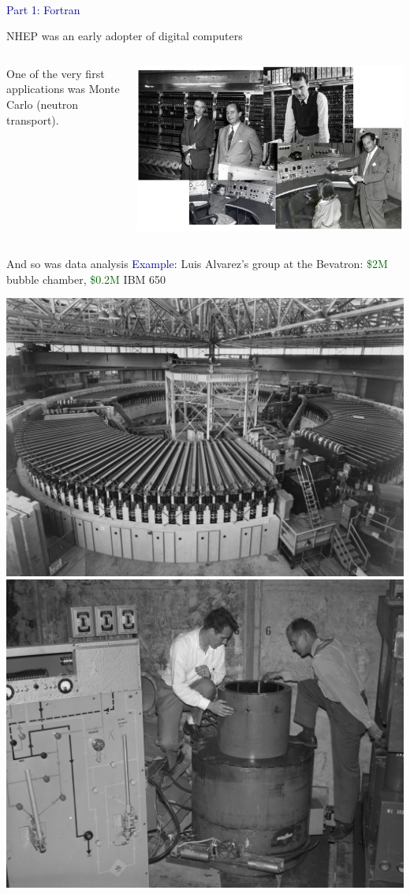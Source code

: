\documentclass[aspectratio=169]{beamer}
\begin{document}
\begin{frame}{\mbox{ }}
\LARGE
\begin{center}
\textcolor{darkblue}{Part 1: Fortran}
\end{center}
\end{frame}

\begin{frame}{NHEP was an early adopter of digital computers}
\Large
\vspace{0.35 cm}
\begin{columns}
One of the very first applications was Monte Carlo (neutron transport).

\vspace{-0.2 cm}
\begin{center}
\includegraphics[width=0.78\linewidth]{PLOTS/manhattan-project-physicists-and-computer.jpg}
\end{center}
\end{columns}
\end{frame}

\begin{frame}{And so was data analysis}
\vspace{0.5 cm}
\textcolor{darkblue}{Example:} Luis Alvarez's group at the Bevatron: \textcolor{darkgreen}{\$2M} bubble chamber, \textcolor{darkgreen}{\$0.2M} IBM 650

\vspace{0.25 cm}
\includegraphics[width=0.45\linewidth]{PLOTS/overall-view-of-bevatron-magnet-photograph-taken-september-6-1955-bevatron-088cb0-1600.jpg}\hfill\includegraphics[width=0.5\linewidth]{PLOTS/alvarez-group-bubble-chamber.jpg}
\end{frame}
\end{document}
